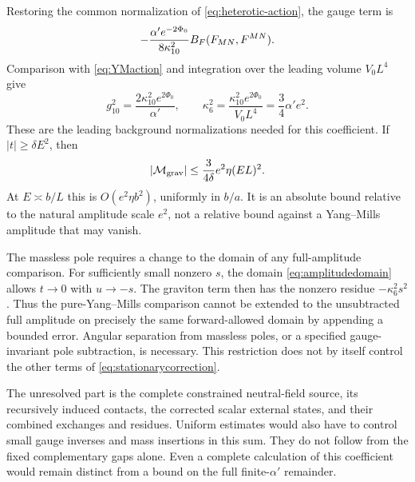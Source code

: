 Restoring the common normalization of \eqref{eq:heterotic-action},
the gauge term is
\[
 -\frac{\alpha'e^{-2\Phi_0}}{8\kappa_{10}^2}
                    B_F(F_{MN},F^{MN}).
\]
Comparison with \eqref{eq:YMaction} and integration over the leading
volume $V_0L^4$ give
\begin{equation}\label{eq:gravitycoupling}
 g_{10}^2=\frac{2\kappa_{10}^2e^{2\Phi_0}}{\alpha'},\qquad
 \kappa_6^2=\frac{\kappa_{10}^2e^{2\Phi_0}}{V_0L^4}
           =\frac34\alpha'e^2.
\end{equation}
These are the leading background normalizations needed for this
coefficient. If $|t|\ge\delta E^2$, then
\begin{equation}\label{eq:gravitybound}
 |\mathcal M_{\rm grav}|
 \le\frac{3}{4\delta}e^2\eta(EL)^2.
\end{equation}
At $E\asymp b/L$ this is $O(e^2\eta b^2)$, uniformly in $b/a$.
It is an absolute bound relative to the natural amplitude scale $e^2$,
not a relative bound against a Yang--Mills amplitude that may vanish.

The massless pole requires a change to the domain of any full-amplitude
comparison. For sufficiently small nonzero $s$, the domain
\eqref{eq:amplitudedomain} allows $t\to0$ with $u\to-s$.
The graviton term then has the nonzero residue $-\kappa_6^2s^2$.
Thus the pure-Yang--Mills comparison cannot be extended to the
unsubtracted full amplitude on precisely the same forward-allowed
domain by appending a bounded error. Angular separation from massless
poles, or a specified gauge-invariant pole subtraction, is necessary.
This restriction does not by itself control the other terms of
\eqref{eq:stationarycorrection}.

The unresolved part is the complete constrained neutral-field source,
its recursively induced contacts, the corrected scalar external states,
and their combined exchanges and residues. Uniform estimates would
also have to control small gauge inverses and mass insertions in this
sum. They do not follow from the fixed complementary gaps alone.
Even a complete calculation of this coefficient would remain distinct
from a bound on the full finite-$\alpha'$ remainder.
